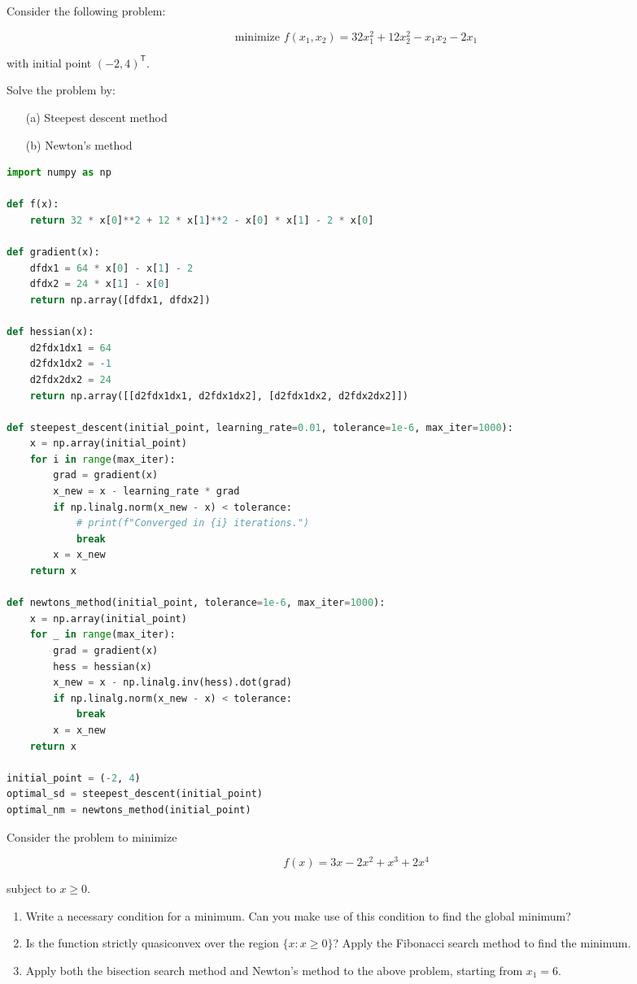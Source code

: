 \documentclass{article}
\begin{document}
\begin{question*}[9]
Consider the following problem:

\[
\text{minimize } f(x_1, x_2) = 32x_1^2 + 12x_2^2 - x_1 x_2 - 2x_1
\]

with initial point \( (-2, 4)^\mathsf{T} \).

Solve the problem by:

\begin{itemize}
    \item[(a)] Steepest descent method
    \item[(b)] Newton's method
\end{itemize}
\end{question*}

\begin{lstlisting}[language=Python]
import numpy as np

def f(x):
    return 32 * x[0]**2 + 12 * x[1]**2 - x[0] * x[1] - 2 * x[0]

def gradient(x):
    dfdx1 = 64 * x[0] - x[1] - 2
    dfdx2 = 24 * x[1] - x[0]
    return np.array([dfdx1, dfdx2])

def hessian(x):
    d2fdx1dx1 = 64
    d2fdx1dx2 = -1
    d2fdx2dx2 = 24
    return np.array([[d2fdx1dx1, d2fdx1dx2], [d2fdx1dx2, d2fdx2dx2]])

def steepest_descent(initial_point, learning_rate=0.01, tolerance=1e-6, max_iter=1000):
    x = np.array(initial_point)
    for i in range(max_iter):
        grad = gradient(x)
        x_new = x - learning_rate * grad
        if np.linalg.norm(x_new - x) < tolerance:
            # print(f"Converged in {i} iterations.")
            break
        x = x_new
    return x

def newtons_method(initial_point, tolerance=1e-6, max_iter=1000):
    x = np.array(initial_point)
    for _ in range(max_iter):
        grad = gradient(x)
        hess = hessian(x)
        x_new = x - np.linalg.inv(hess).dot(grad)
        if np.linalg.norm(x_new - x) < tolerance:
            break
        x = x_new
    return x

initial_point = (-2, 4)
optimal_sd = steepest_descent(initial_point)
optimal_nm = newtons_method(initial_point)
\end{lstlisting}

\clearpage

\begin{question*}[10]
Consider the problem to minimize 

\[
f(x) = 3x - 2x^2 + x^3 + 2x^4
\]

subject to \( x \geq 0 \).

\begin{enumerate}[label=\alph*.]
    \item Write a necessary condition for a minimum. Can you make use of this condition to find the global minimum?
    \item Is the function strictly quasiconvex over the region \( \{ x : x \geq 0 \} \)? Apply the Fibonacci search method to find the minimum.
    \item Apply both the bisection search method and Newton's method to the above problem, starting from \( x_1 = 6 \).
\end{enumerate}
\end{question*}
\end{document}
